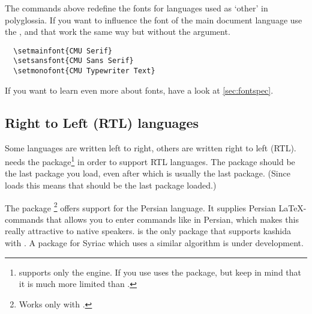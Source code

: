 The commands above redefine the fonts for languages used as \enquote*{other} in
polyglossia. If you want to influence the font of the main document language
use the ,  and  that work the
same way but without the  argument.
\begin{verbatim}
  \setmainfont{CMU Serif}
  \setsansfont{CMU Sans Serif}
  \setmonofont{CMU Typewriter Text}
\end{verbatim}

If you want to learn even more about fonts, have a look at
\autoref{sec:fontspec}.

\subsection{Right to Left (RTL) languages}

Some languages are written left to right, others are written right to left
(RTL).  needs the  package\footnote{
  supports only the  engine. If you use 
   uses the  package, but keep in mind that it
  is much more limited than .} in order to support RTL languages. The
 package should be the last package you load, even after
 which is usually the last package. (Since 
loads  this means that  should be the last package
loaded.)


The package \footnote{Works only with
  .} offers support for the Persian language. It
supplies Persian \LaTeX-commands that allows you to enter commands like
 in Persian, which makes this really attractive to native speakers.
 is the only package that supports kashida with
. A package for Syriac which uses a similar algorithm is under
development.

